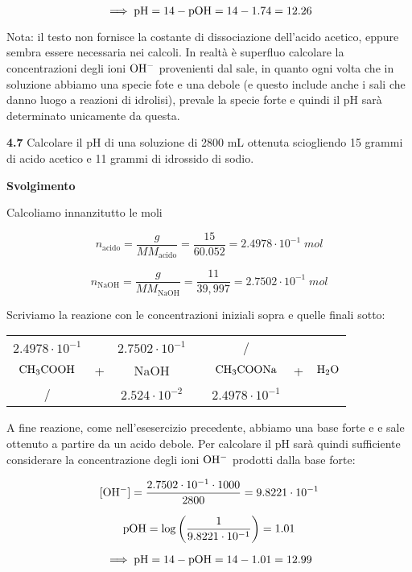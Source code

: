$$\implies \rm pH=14-pOH=14-1.74=12.26$$

Nota: il testo non fornisce la costante di dissociazione dell'acido acetico, eppure sembra essere necessaria nei calcoli. In realtà è superfluo calcolare la concentrazioni degli ioni $\rm OH^-$ provenienti dal sale, in quanto ogni volta che in soluzione abbiamo una specie fote e una debole (e questo include anche i sali che danno luogo a reazioni di idrolisi), prevale la specie forte e quindi il pH sarà determinato unicamente da questa.

\vspace{0.2cm}\textbf{4.7} Calcolare il pH di una soluzione di 2800 mL ottenuta sciogliendo 15 grammi di acido acetico e 11 grammi di idrossido di sodio.

\vspace{0.2cm}\large\textbf{Svolgimento}\normalsize

\vspace{0.2cm}Calcoliamo innanzitutto le moli

$$n_{\text{acido}}=\frac{g}{MM_{\text{acido}}}=\frac{15}{60.052}=2.4978 \cdot 10^{-1}\;mol$$

$$n_{\text{NaOH}}=\frac{g}{MM_{\text{NaOH}}}=\frac{11}{39,997}=2.7502 \cdot 10^{-1}\;mol$$

Scriviamo la reazione con le concentrazioni iniziali sopra e quelle finali sotto:

\begin{center}
    \begin{tabular}{ccccccc}
        $2.4978 \cdot 10^{-1}$ &  & $2.7502 \cdot 10^{-1}$ & & / &&\\
        $\rm CH_3COOH$ & + & NaOH & \ce{->} & $\rm CH_3COONa$ & + & $\rm H_2O$\\
        / &  &  $2.524 \cdot 10^{-2}$ & & $2.4978 \cdot 10^{-1}$&&\\
    \end{tabular}
\end{center}

A fine reazione, come nell'esesercizio precedente, abbiamo una base forte e e sale ottenuto a partire da un acido debole. Per calcolare il pH sarà quindi sufficiente considerare la concentrazione degli ioni $\rm OH^-$ prodotti dalla base forte:

$$[\rm OH^-]=\frac{2.7502 \cdot 10^{-1} \cdot 1000}{2800}=9.8221 \cdot 10^{-1}$$

$$\rm pOH=\log{\left(\frac{1}{9.8221 \cdot 10^{-1}}\right)}=1.01$$

$$\implies \rm pH=14-pOH=14-1.01=12.99$$

